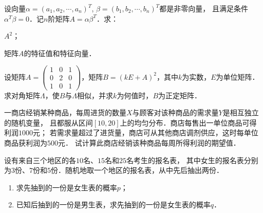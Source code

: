 \documentclass[plain,noanswer,medmath]{../../template/jnuexam}
\begin{document}

\begin{problem}
设向量$\alpha = (a_1,a_2, \cdots ,a_n)^T$, $\beta = (b_1,b_2, \cdots ,b_n)^T$都是非零向量，
且满足条件$\alpha^T\beta = 0$．记$n$阶矩阵$A = \alpha \beta^T$．求：\par
\begin{enumerate*}
\item $A^2$；
\item 矩阵$A$的特征值和特征向量．
\end{enumerate*}
\end{problem}



\begin{problem}
设矩阵$A = \begin{pmatrix}
  1 & 0 & 1 \\
  0 & 2 & 0 \\
  1 & 0 & 1
\end{pmatrix}$，矩阵$B = (kE + A)^2$，其中$k$为实数，$E$为单位矩阵．
求对角矩阵$\Lambda$，使$B$与$\Lambda$相似，并求$k$为何值时，$B$为正定矩阵．
\end{problem}



\begin{problem}
一商店经销某种商品，每周进货的数量$X$与顾客对该种商品的需求量$Y$是相互独立的随机变量，
且都服从区间$\left[10,20 \right]$上的均匀分布．商店每售出一单位商品可得利润$1000$元；
若需求量超过了进货量，商店可从其他商店调剂供应，这时每单位商品获利润为$500$元．
试计算此商店经销该种商品每周所得利润的期望值．
\end{problem}



\begin{problem}
设有来自三个地区的各$10$名、$15$名和$25$名考生的报名表，
其中女生的报名表分别为$3$份、$7$份和$5$份．随机地取一个地区的报名表，从中先后抽出两份．
\begin{enumerate}
\item 求先抽到的一份是女生表的概率$p$；
\item 已知后抽到的一份是男生表，求先抽到的一份是女生表的概率$q$．
\end{enumerate}
\end{problem}
\end{document}
